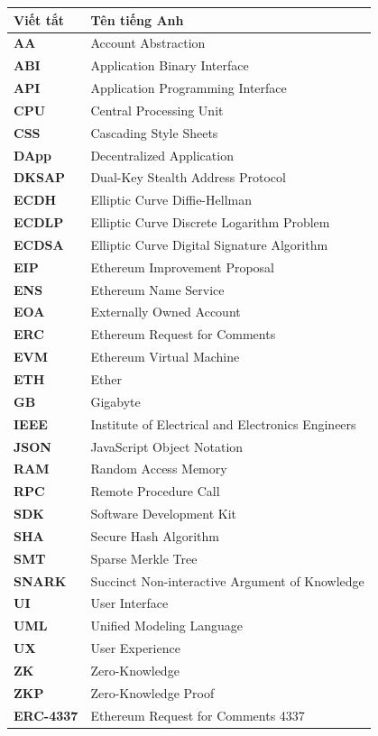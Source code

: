 \documentclass[../DoAn.tex]{subfiles}
\begin{document}
\begin{longtable}{l p{14cm}}
	\hline
	\textbf{Viết tắt} & \textbf{Tên tiếng Anh} \\
	\hline
	
	\textbf{AA} & Account Abstraction \\
	\textbf{ABI} & Application Binary Interface \\
	\textbf{API} & Application Programming Interface \\
	\textbf{CPU} & Central Processing Unit \\
	\textbf{CSS} & Cascading Style Sheets \\
	\textbf{DApp} & Decentralized Application \\
	\textbf{DKSAP} & Dual-Key Stealth Address Protocol \\
	\textbf{ECDH} & Elliptic Curve Diffie-Hellman \\
	\textbf{ECDLP} & Elliptic Curve Discrete Logarithm Problem \\
	\textbf{ECDSA} & Elliptic Curve Digital Signature Algorithm \\
	\textbf{EIP} & Ethereum Improvement Proposal \\
	\textbf{ENS} & Ethereum Name Service \\
	\textbf{EOA} & Externally Owned Account \\
	\textbf{ERC} & Ethereum Request for Comments \\
	\textbf{EVM} & Ethereum Virtual Machine \\
	\textbf{ETH} & Ether \\
	\textbf{GB} & Gigabyte \\
	\textbf{IEEE} & Institute of Electrical and Electronics Engineers \\
	\textbf{JSON} & JavaScript Object Notation \\
	\textbf{RAM} & Random Access Memory \\
	\textbf{RPC} & Remote Procedure Call \\
	\textbf{SDK} & Software Development Kit \\
	\textbf{SHA} & Secure Hash Algorithm \\
	\textbf{SMT} & Sparse Merkle Tree \\
	\textbf{SNARK} & Succinct Non-interactive Argument of Knowledge \\
	\textbf{UI} & User Interface \\
	\textbf{UML} & Unified Modeling Language \\
	\textbf{UX} & User Experience \\
	\textbf{ZK} & Zero-Knowledge \\
	\textbf{ZKP} & Zero-Knowledge Proof \\
	\textbf{ERC-4337} & Ethereum Request for Comments 4337 \\
	
	\hline
\end{longtable}
\end{document}
